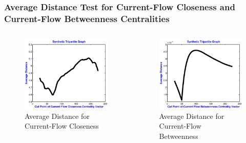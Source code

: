 \documentclass{beamer}
\begin{document}
\begin{frame}
\frametitle{Average Distance Test for Current-Flow Closeness and Current-Flow Betweenness Centralities}
\begin{columns}[T]
\begin{column}{.5\textwidth}
\begin{figure}[h]
\begin{center}
\includegraphics[width=0.76\columnwidth]{avgdist_cfclose}
\end{center}
\caption{Average Distance for Current-Flow Closeness}
\label{fig:Average distance for current flow closeness centrality vector}
\end{figure}
\end{column}
\begin{column}{.5\textwidth}
\begin{figure}[h]
\begin{center}
\includegraphics[width=0.76\columnwidth]{avgdist_cfbetw}
\end{center}
\caption{Average Distance for Current-Flow Betweenness}
\label{fig:Average distance for current flow betweenness centrality vector}
\end{figure}
\end{column}
\end{columns}
\end{frame}
\end{document}
